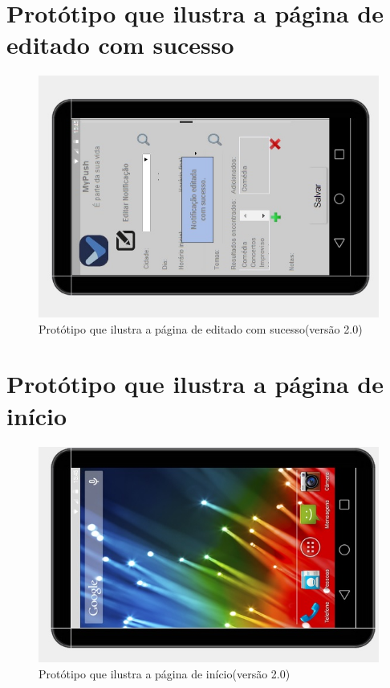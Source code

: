 \begin{apendicesenv}
    \pagebreak
      \section*{Protótipo que ilustra a página de editado com sucesso}

    \begin{figure}[!htbp]
      \centering
      \includegraphics[scale=0.9, angle=-90]{editaveis/figuras/prototipo_alta_fidelidade_v2/2_15}
      \caption{Protótipo que ilustra a página de editado com sucesso(versão 2.0)}
      \label{v2}
    \end{figure}
    
    \pagebreak
      \section*{Protótipo que ilustra a página de início}

    \begin{figure}[!htbp]
      \centering
      \includegraphics[scale=0.9, angle=-90]{editaveis/figuras/prototipo_alta_fidelidade_v2/2_16}
      \caption{Protótipo que ilustra a página de início(versão 2.0)}
      \label{v2}
    \end{figure}



\end{apendicesenv}
